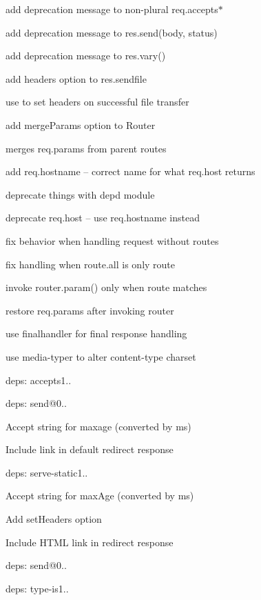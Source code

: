 \begin{DoxyItemize}
\item add deprecation message to non-\/plural {\ttfamily req.\+accepts$\ast$}
\item add deprecation message to {\ttfamily res.\+send(body, status)}
\item add deprecation message to {\ttfamily res.\+vary()}
\item add {\ttfamily headers} option to {\ttfamily res.\+sendfile}
\begin{DoxyItemize}
\item use to set headers on successful file transfer
\end{DoxyItemize}
\item add {\ttfamily merge\+Params} option to {\ttfamily Router}
\begin{DoxyItemize}
\item merges {\ttfamily req.\+params} from parent routes
\end{DoxyItemize}
\item add {\ttfamily req.\+hostname} -- correct name for what {\ttfamily req.\+host} returns
\item deprecate things with {\ttfamily depd} module
\item deprecate {\ttfamily req.\+host} -- use {\ttfamily req.\+hostname} instead
\item fix behavior when handling request without routes
\item fix handling when {\ttfamily route.\+all} is only route
\item invoke {\ttfamily router.\+param()} only when route matches
\item restore {\ttfamily req.\+params} after invoking router
\item use {\ttfamily finalhandler} for final response handling
\item use {\ttfamily media-\/typer} to alter content-\/type charset
\item deps\+: accepts1..
\item deps\+: send@0..
\begin{DoxyItemize}
\item Accept string for {\ttfamily maxage} (converted by {\ttfamily ms})
\item Include link in default redirect response
\end{DoxyItemize}
\item deps\+: serve-\/static1..
\begin{DoxyItemize}
\item Accept string for {\ttfamily max\+Age} (converted by {\ttfamily ms})
\item Add {\ttfamily set\+Headers} option
\item Include H\+T\+M\+L link in redirect response
\item deps\+: send@0..
\end{DoxyItemize}
\item deps\+: type-\/is1..
\end{DoxyItemize}

